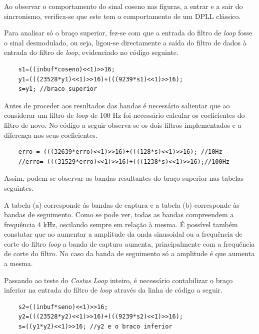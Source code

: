 \documentclass[11pt]{article}
\numberwithin{equation}{section}
\begin{document}
Ao observar o comportamento do sinal coseno nas figuras, a entrar e a sair do sincronismo, verifica-se que este tem o comportamento de um DPLL clássico.

Para analisar só o braço superior, fez-se com que a entrada do filtro de \textit{loop} fosse o sinal desmodulado, ou seja, ligou-se directamente a saída do filtro de dados à entrada do filtro de \textit{loop}, evidenciado no código seguinte.
\begin{lstlisting}
	s1=((inbuf*coseno)<<1)>>16;
	y1=(((23528*y1)<<1)>>16)+(((9239*s1)<<1)>>16);
	s=y1; //braco superior
\end{lstlisting}

Antes de proceder aos resultados das bandas é necessário salientar que ao considerar um filtro de \textit{loop} de 100 Hz foi necessário calcular os coeficientes do filtro de novo. No código a seguir observa-se os dois filtros implementados e a diferença nos seus coeficientes. 
\begin{lstlisting}
	erro = (((32639*erro)<<1)>>16)+(((128*s)<<1)>>16); //10Hz
	//erro= (((31529*erro)<<1)>>16)+(((1238*s)<<1)>>16);//100Hz
\end{lstlisting}

Assim, podem-se observar as bandas resultantes do braço superior nas tabelas seguintes.
\begin{figure}[H]
	\centering
	\hspace{6 mm}
\end{figure}

A tabela (a) corresponde às bandas de captura e a tabela (b) corresponde às bandas de seguimento. Como se pode ver, todas as bandas compreendem a frequência 4 kHz, oscilando sempre em relação à mesma.
É possível também constatar que ao aumentar a amplitude da onda sinusoidal ou a frequência de corte do filtro \textit{loop} a banda de captura aumenta, principalmente com a frequência de corte do filtro. No caso da banda de seguimento só a amplitude é que aumenta a mesma.

Passando ao teste do \textit{Costas Loop} inteiro, é necessário contabilizar o braço inferior na entrada do filtro de \textit{loop} através da linha de código a seguir.
\begin{lstlisting}
	s2=((inbuf*seno)<<1)>>16;
	y2=(((23528*y2)<<1)>>16)+(((9239*s2)<<1)>>16);
	s=((y1*y2)<<1)>>16; //y2 e o braco inferior
\end{lstlisting}
\end{document}
